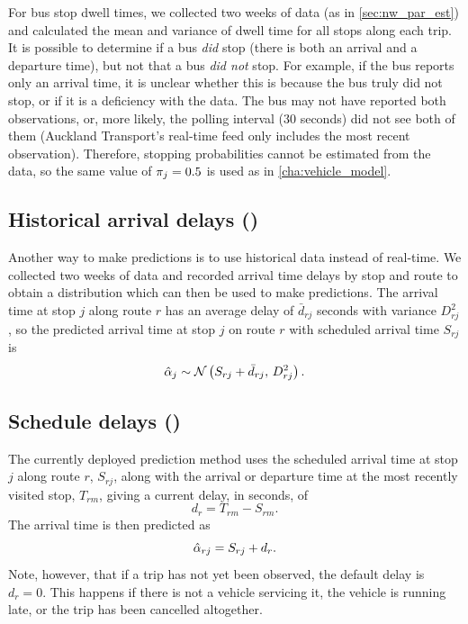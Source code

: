 For bus stop dwell times, we collected two weeks of data (as in \cref{sec:nw_par_est}) and calculated the mean and variance of dwell time for all stops along each trip. It is possible to determine if a bus \emph{did} stop (there is both an arrival and a departure time), but not that a bus \emph{did not} stop. For example, if the bus reports only an arrival time, it is unclear whether this is because the bus truly did not stop, or if it is a deficiency with the data. The bus may not have reported both observations, or, more likely, the polling interval (30 seconds) did not see both of them (Auckland Transport's real-time feed only includes the most recent observation). Therefore, stopping probabilities cannot be estimated from the data, so the same value of $\pi_j=0.5$ is used as in \cref{cha:vehicle_model}.





\subsection[Historical arrival delays]{Historical arrival delays (\Fhist{})}
\label{eq:prediction_arrival_historical}

Another way to make predictions is to use historical data instead of real-time. We collected two weeks of data and recorded arrival time delays by stop and route to obtain a distribution which can then be used to make predictions. The arrival time at stop $j$ along route $r$ has an average delay of $\bar d_{rj}$ seconds with variance $D_{rj}^2$, so the predicted arrival time at stop $j$ on route $r$ with scheduled arrival time $S_{rj}$ is
\begin{equation}
\label{eq:arrival_pred_historical}
\hat{\alpha}_{j} \sim \mathcal{N}\left(S_{rj} + \bar d_{rj},\, D_{rj}^2\right).
\end{equation}


\subsection[Schedule delays]{Schedule delays (\Fsched{})}
\label{eq:prediction_arrival_sched_delay}

The currently deployed prediction method uses the scheduled arrival time at stop $j$ along route $r$, $S_{rj}$, along with the arrival or departure time at the most recently visited stop, $T_{rm}$, giving a current delay, in seconds, of
\begin{equation}
\label{eq:sched_cur_delay}
d_{r} = T_{rm} - S_{rm}.
\end{equation}
The arrival time is then predicted as
\begin{equation}
\label{eq:sched_pred_arr}
\hat{\alpha}_{rj} = S_{rj} + d_r.
\end{equation}
Note, however, that if a trip has not yet been observed, the default delay is $d_r = 0$. This happens if there is not a vehicle servicing it, the vehicle is running late, or the trip has been cancelled altogether.
